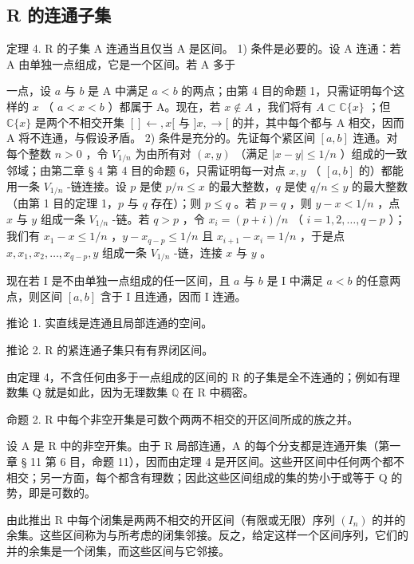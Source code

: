 \subsection{R 的连通子集}

定理 4. R 的子集 A 连通当且仅当 A 是区间。 1) 条件是必要的。设 A 连通：若 A 由单独一点组成，它是一个区间。若 A 多于

一点，设 \(a\) 与 \(b\) 是 A 中满足 \(a < b\) 的两点；由第 4 目的命题 1，只需证明每个这样的 \(x\) （ \(a < x < b\) ）都属于 A。现在，若 \(x \notin A\) ，我们将有 \(A \subset \mathbb{C}\{x\}\) ；但 \(\mathbb{C}\{x\}\) 是两个不相交开集 \([] \leftarrow, x[\) 与 \(]x, \rightarrow[\) 的并，其中每个都与 A 相交，因而 A 将不连通，与假设矛盾。 2) 条件是充分的。先证每个紧区间 \([a, b]\) 连通。对每个整数 \(n > 0\) ，令 \(V_{1/n}\) 为由所有对 \((x, y)\) （满足 \(|x - y| \leqslant 1/n\) ）组成的一致邻域；由第二章 § 4 第 4 目的命题 6，只需证明每一对点 \(x, y\) （ \([a, b]\) 的）都能用一条 \(V_{1/n}\) -链连接。设 \(p\) 是使 \(p/n \leqslant x\) 的最大整数，\(q\) 是使 \(q/n \leqslant y\) 的最大整数（由第 1 目的定理 1，\(p\) 与 \(q\) 存在）；则 \(p \leqslant q\) 。若 \(p = q\) ，则 \(y - x < 1/n\) ，点 \(x\) 与 \(y\) 组成一条 \(V_{1/n}\) -链。若 \(q > p\) ，令 \(x_i = (p + i)/n\) （ \(i = 1, 2, \ldots, q - p\) ）；我们有 \(x_1 - x \leqslant 1/n\) ，\(y - x_{q-p} \leqslant 1/n\) 且 \(x_{i+1} - x_i = 1/n\) ，于是点 \(x, x_1, x_2, \ldots, x_{q-p}, y\) 组成一条 \(V_{1/n}\) -链，连接 \(x\) 与 \(y\) 。

现在若 I 是不由单独一点组成的任一区间，且 \(a\) 与 \(b\) 是 I 中满足 \(a < b\) 的任意两点，则区间 \([a, b]\) 含于 I 且连通，因而 I 连通。

推论 1. 实直线是连通且局部连通的空间。

推论 2. R 的紧连通子集只有有界闭区间。

由定理 4，不含任何由多于一点组成的区间的 R 的子集是全不连通的；例如有理数集 Q 就是如此，因为无理数集 \(\mathbb{Q}\) 在 R 中稠密。

命题 2. R 中每个非空开集是可数个两两不相交的开区间所成的族之并。

设 A 是 R 中的非空开集。由于 R 局部连通，A 的每个分支都是连通开集（第一章 § 11 第 6 目，命题 11），因而由定理 4 是开区间。这些开区间中任何两个都不相交；另一方面，每个都含有理数；因此这些区间组成的集的势小于或等于 Q 的势，即是可数的。

由此推出 R 中每个闭集是两两不相交的开区间（有限或无限）序列 \((I_{n})\) 的并的余集。这些区间称为与所考虑的闭集邻接。反之，给定这样一个区间序列，它们的并的余集是一个闭集，而这些区间与它邻接。

